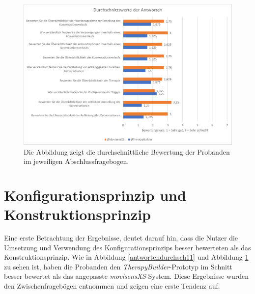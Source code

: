 \begin{figure}[h]
\centering
\includegraphics[width=1\textwidth]{pictures/diagramme/antwortendurchsch2}
\caption{Die Abbildung zeigt die durchschnittliche Bewertung der Probanden im jeweiligen Abschlussfragebogen.}
\label{antwortendurchsch22}
\end{figure}


\section{Konfigurationsprinzip und Konstruktionsprinzip}
Eine erste Betrachtung der Ergebnisse, deutet darauf hin, dass die Nutzer die Umsetzung und Verwendung des Konfigurationsprinzips besser bewerteten als das Konstruktionsprinzip. Wie in Abbildung \ref{antwortendurchsch11} und Abbildung \ref{antwortendurchsch22} zu sehen ist, haben die Probanden den \emph{TherapyBuilder}-Prototyp im Schnitt besser bewertet als das angepasste \emph{movisensXS}-System. Diese Ergebnisse wurden den Zwischenfragebögen entnommen und zeigen eine erste Tendenz auf. 

